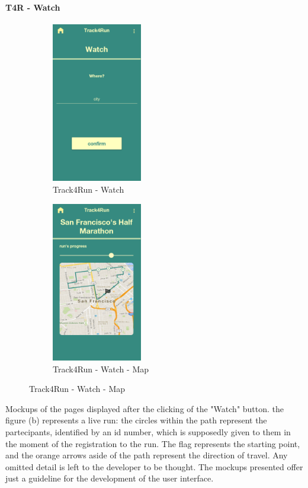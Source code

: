 \paragraph{T4R - Watch}
\begin{figure}[H]
\centering
\begin{subfigure}{.5\textwidth}
    \includegraphics[width=.9\linewidth, height = 7cm, keepaspectratio]{./Images/Mockups/Track4Run/T4R_Watch.png}
    \centering
    \caption{Track4Run - Watch}
  \end{subfigure}%
\begin{subfigure}{.5\textwidth}
    \includegraphics[width=.9\linewidth, height = 7cm, keepaspectratio]{./Images/Mockups/Track4Run/T4R_Watch_Map.png}
    \centering
    \caption{Track4Run - Watch - Map}
  \end{subfigure}
\end{figure}
  Mockups of the pages displayed after the clicking of the "Watch" button.
  the figure (b) represents a live run: the circles within the path represent the partecipants, identified by an id number, which is supposedly given to them in the moment of the registration to the run. The flag represents the starting point, and the orange arrows aside of the path represent the direction of travel.
  \newline
  Any omitted detail is left to the developer to be thought. The mockups presented offer just a guideline for the development of the user interface.








